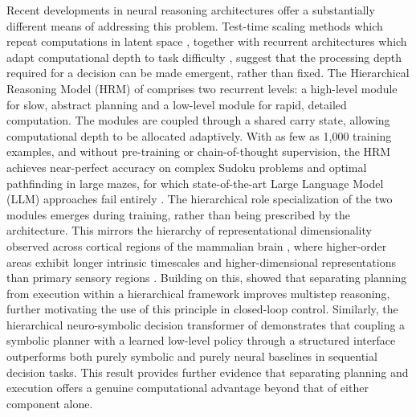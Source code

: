 \documentclass[12pt, a4paper]{article}
\begin{document}
Recent developments in neural reasoning architectures offer a substantially different means of addressing this problem.
Test-time scaling methods which repeat computations in latent space \parencite{geiping_scaling_2025, li_seek_2025}, together with recurrent architectures which adapt computational depth to task difficulty \parencite{geiping_scaling_2025, li_system_2025}, suggest that the processing depth required for a decision can be made emergent, rather than fixed.
The Hierarchical Reasoning Model (HRM) of \textcite{wang_hierarchical_2025} comprises two recurrent levels: a high-level module for slow, abstract planning and a low-level module for rapid, detailed computation.
The modules are coupled through a shared carry state, allowing computational depth to be allocated adaptively.
With as few as 1{,}000 training examples, and without pre-training or chain-of-thought supervision, the HRM achieves near-perfect accuracy on complex Sudoku problems and optimal pathfinding in large mazes, for which state-of-the-art Large Language Model (LLM) approaches fail entirely \parencite{wang_hierarchical_2025, huang_towards_2023, feng_efficient_2025}.
The hierarchical role specialization of the two modules emerges during training, rather than being prescribed by the architecture.
This mirrors the hierarchy of representational dimensionality observed across cortical regions of the mammalian brain , where higher-order areas exhibit longer intrinsic timescales and higher-dimensional representations than primary sensory regions \parencite{badre_frontal_2018, huntenburg_large-scale_2018, murray_hierarchy_2014}.
Building on this, \textcite{jin_decoupled_2025} showed that separating planning from execution within a hierarchical framework improves multistep reasoning, further motivating the use of this principle in closed-loop control.
Similarly, the hierarchical neuro-symbolic decision transformer of \textcite{baheri_hierarchical_2025} demonstrates that coupling a symbolic planner with a learned low-level policy through a structured interface outperforms both purely symbolic and purely neural baselines in sequential decision tasks.
This result provides further evidence that separating planning and execution offers a genuine computational advantage beyond that of either component alone.
 
\end{document}
